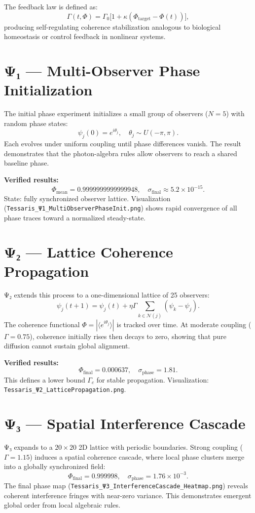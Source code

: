 \documentclass[12pt]{article}
\begin{document}
The feedback law is defined as:
\[
\Gamma(t,\Phi) = \Gamma_0 \big[1 + \kappa (\Phi_\text{target} - \Phi(t)) \big],
\]
producing self-regulating coherence stabilization analogous to biological homeostasis or control feedback in nonlinear systems.

\section{Ψ₁ — Multi-Observer Phase Initialization}
The initial phase experiment initializes a small group of observers ($N=5$) with random phase states:
\[
\psi_j(0) = e^{i\theta_j}, \quad \theta_j \sim U(-\pi, \pi).
\]
Each evolves under uniform coupling until phase differences vanish.
The result demonstrates that the photon-algebra rules allow observers to reach a shared baseline phase.

\textbf{Verified results:}
\[
\Phi_\text{mean} = 0.9999999999999948, \quad \sigma_\text{final} \approx 5.2\times10^{-15}.
\]
State: fully synchronized observer lattice.  
Visualization (\texttt{Tessaris\_Ψ1\_MultiObserverPhaseInit.png}) shows rapid convergence of all phase traces toward a normalized steady-state.

\section{Ψ₂ — Lattice Coherence Propagation}
Ψ₂ extends this process to a one-dimensional lattice of 25 observers:
\[
\psi_j(t+1) = \psi_j(t) + \eta \Gamma \sum_{k \in \mathcal{N}(j)} (\psi_k - \psi_j).
\]
The coherence functional $\Phi = |\langle e^{i\theta_j}\rangle|$ is tracked over time.
At moderate coupling ($\Gamma = 0.75$), coherence initially rises then decays to zero, showing that pure diffusion cannot sustain global alignment.

\textbf{Verified results:}
\[
\Phi_\text{final} = 0.000637, \quad \sigma_\text{phase} = 1.81.
\]
This defines a lower bound $\Gamma_c$ for stable propagation.  
Visualization: \texttt{Tessaris\_Ψ2\_LatticePropagation.png}.

\section{Ψ₃ — Spatial Interference Cascade}
Ψ₃ expands to a $20\times20$ 2D lattice with periodic boundaries.
Strong coupling ($\Gamma = 1.15$) induces a spatial coherence cascade, where local phase clusters merge into a globally synchronized field:
\[
\Phi_\text{final} = 0.999998, \quad \sigma_\text{phase} = 1.76\times10^{-3}.
\]
The final phase map (\texttt{Tessaris\_Ψ3\_InterferenceCascade\_Heatmap.png}) reveals coherent interference fringes with near-zero variance.
This demonstrates emergent global order from local algebraic rules.
\end{document}
